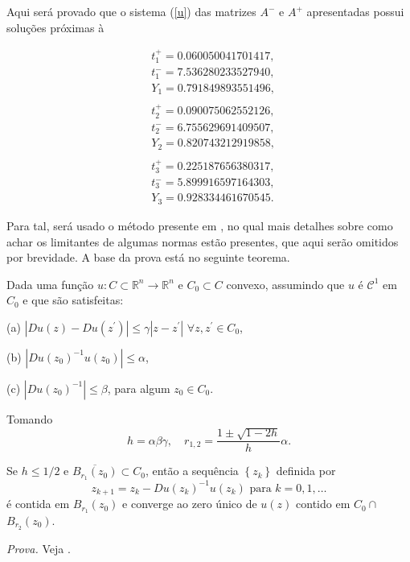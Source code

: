 Aqui será provado que o sistema (\ref{u}) das matrizes $A^-$ e $A^+$ apresentadas possui soluções próximas à

\begin{align}
\label{cicl}
&t^+_1 = 0.060050041701417\nonumber,\\
&t^-_1 = 7.536280233527940\nonumber,\\
&Y_1 = 0.791849893551496\nonumber,\\
\nonumber\\
&t^+_2 = 0.090075062552126\nonumber,\\
&t^-_2 = 6.755629691409507,\\
&Y_2 = 0.820743212919858\nonumber,\\
\nonumber\\
&t^+_3 = 0.225187656380317\nonumber,\\
&t^-_3 = 5.899916597164303\nonumber,\\
&Y_3 = 0.928334461670545\nonumber.
\end{align}

Para tal, será usado o método presente em \cite{LilPonce2012}, no qual mais detalhes sobre como achar os limitantes de algumas normas estão presentes, que aqui serão omitidos por brevidade. A base da prova está no seguinte teorema.
\begin{theorem}
Dada uma função $u: C \subset \mathbb{R}^{n} \rightarrow \mathbb{R}^{n}$ e $C_{0} \subset C$ convexo, assumindo que $u$ é $\mathcal{C}^{1}$ em $C_{0}$ e que são satisfeitas:

(a) $\left|D u(z)-D u\left(z^{\prime}\right)\right| \leq \gamma\left|z-z^{\prime}\right|$ $\forall z, z^{\prime} \in C_{0}$,

(b) $\left|D u\left(z_{0}\right)^{-1} u\left(z_{0}\right)\right| \leq \alpha$,

(c) $\left|D u\left(z_{0}\right)^{-1}\right| \leq \beta$,
para algum $z_{0} \in C_{0}$. 

Tomando
$$
h=\alpha \beta \gamma, \quad r_{1,2}=\frac{1 \pm \sqrt{1-2 h}}{h} \alpha .
$$

Se $h \leq 1 / 2$ e $\overline{B_{r_{1}}\left(z_{0}\right)} \subset C_{0}$, então a sequência $\left\{z_{k}\right\}$ definida por
$$
z_{k+1}=z_{k}-D u\left(z_{k}\right)^{-1} u\left(z_{k}\right) \text { para } k=0,1, \ldots
$$
é contida em $B_{r_{1}}\left(z_{0}\right)$ e converge ao zero único de $u(z)$ contido em $C_{0} \cap$ $B_{r_{2}}\left(z_{0}\right)$.
\end{theorem}
\textit{Prova.} Veja \cite{Tapia1971}.


